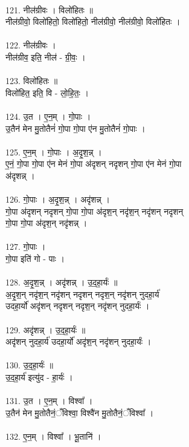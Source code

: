 \\
121. नील॑ग्रीवः । विलो॑हितः ॥\\
नील॑ग्रीवो॒ विलो॑हितो॒ विलो॑हितो॒ नील॑ग्रीवो॒ नील॑ग्रीवो॒ विलो॑हितः ।\\
\\
122. नील॑ग्रीवः ।\\
नील॑ग्रीव॒ इति॒ नील॑ - ग्री॒वः॒ ।\\
\\
123. विलो॑हितः ॥\\
विलो॑हित॒ इति॒ वि - लो॒हि॒तः॒ ।\\
\\
124. उ॒त । ए॒न॒म् । गो॒पाः ।\\
उ॒तैन॑ मेन मु॒तोतैनं॑ गो॒पा गो॒पा ए॑न मु॒तोतैनं॑ गो॒पाः ।\\
\\
125. ए॒न॒म् । गो॒पाः । अ॒दृ॒श॒न्न् ।\\
ए॒नं॒ गो॒पा गो॒पा ए॑न मेनं गो॒पा अ॑दृशन् नदृशन् गो॒पा ए॑न मेनं गो॒पा\\
अ॑दृशन्न् ।\\
\\
126. गो॒पाः । अ॒दृ॒श॒न्न् । अदृ॑शन्न् ।\\
गो॒पा अ॑दृशन् नदृशन् गो॒पा गो॒पा अ॑दृश॒न् नदृ॑श॒न् नदृ॑शन् नदृशन्\\
गो॒पा गो॒पा अ॑दृश॒न् नदृ॑शन्न् ।\\
\\
127. गो॒पाः ।\\
गो॒पा इति॑ गो - पाः ।\\
\\
128. अ॒दृ॒श॒न्न् । अदृ॑शन्न् । उ॒द॒हा॒र्यः॑ ॥\\
अ॒दृ॒श॒न् नदृ॑श॒न् नदृ॑शन् नदृशन् नदृश॒न् नदृ॑शन् नुदहा॒र्य॑\\
उदहा॒र्यो॑ अदृ॑शन् नदृशन् नदृश॒न् नदृ॑शन् नुदहा॒र्यः॑ ।\\
\\
129. अदृ॑शन्न् । उ॒द॒हा॒र्यः॑ ॥\\
अदृ॑शन् नुदहा॒र्य॑ उदहा॒र्यो॑ अदृ॑श॒न् नदृ॑शन् नुदहा॒र्यः॑ ।\\
\\
130. उ॒द॒हा॒र्यः॑ ॥\\
उ॒द॒हा॒र्य॑ इत्यु॑द - हा॒र्यः॑ ।\\
\\
131. उ॒त । ए॒न॒म् । विश्वा᳚ ।\\
उ॒तैन॑ मेन मु॒तोतैनं॒ँविश्वा॒ विश्वै॑न मु॒तोतैनं॒ँविश्वा᳚ ।\\
\\
132. ए॒न॒म् । विश्वा᳚ । भू॒तानि॑ ।\\
